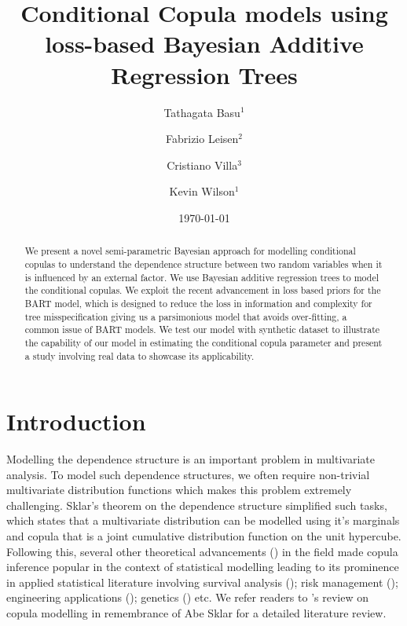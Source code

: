 \documentclass{amsart}
\title{Conditional Copula models using loss-based Bayesian Additive Regression Trees}
\author{Tathagata Basu$^1$}
\author{Fabrizio Leisen$^2$}
\author{Cristiano Villa$^3$}
\author{Kevin Wilson$^1$}
\date{\today}
\begin{document}
\begin{abstract}
	 We present a novel semi-parametric Bayesian approach for modelling conditional copulas to understand the dependence structure between two random variables when it is influenced by an external factor. We use Bayesian additive regression trees to model the conditional copulas. We exploit the recent advancement in loss based priors for the BART model, which is designed to reduce the loss in information and complexity for tree misspecification giving us a parsimonious model that avoids over-fitting, a common issue of BART models. We test our model with synthetic dataset to illustrate the capability of our model in estimating the conditional copula parameter and present a study involving real data to showcase its applicability.
\end{abstract}


\maketitle

\section{Introduction}
Modelling the dependence structure is an important problem in multivariate analysis. To model such dependence structures, we often require non-trivial multivariate distribution functions which makes this problem extremely challenging. Sklar's theorem\cite{sklar:1959} on the dependence structure simplified such tasks, which states that a multivariate distribution can be modelled using it's marginals and copula that is a joint cumulative distribution function on the unit hypercube. Following this, several other theoretical advancements (\citet{kimeldori1975uniform,ruschendorf1976,schweizer1981,Genest01091993,Genest1993mult}) in the field made copula inference popular in the context of statistical modelling leading to its prominence in applied statistical literature involving  survival analysis (\citet 	{clayton1978model,oakes1989bivariate,zheng1995estimates,shih1995inferences,braekers2005copula}); risk management (\citet{fama1993common,BURGERT2006289,engle1990asset}); engineering applications (\citet{salvadori2007use,aghakouchak2010copula}); genetics (\citet{li2006quantitative}) etc. We refer readers to \citet{GENEST2024105278}'s review on copula modelling in remembrance of Abe Sklar for a detailed literature review.
\end{document}
